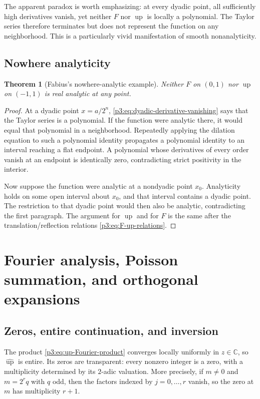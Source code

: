 \documentclass[11pt]{article}
\numberwithin{equation}{section}
\newtheorem{theorem}{Theorem}[section]
\theoremstyle{definition}
\theoremstyle{remark}
\newcommand{\C}{\mathbb C}
\newcommand{\upf}{\operatorname{up}}
\begin{document}
The apparent paradox is worth emphasizing: at every dyadic point, all sufficiently high derivatives vanish, yet neither $F$ nor $\upf$ is locally a polynomial.  The Taylor series therefore terminates but does not represent the function on any neighborhood.  This is a particularly vivid manifestation of smooth nonanalyticity.

\subsection{Nowhere analyticity}

\begin{theorem}[Fabius's nowhere-analytic example]\label{p3:thm:nowhere-analytic}
Neither $F$ on $(0,1)$ nor $\upf$ on $(-1,1)$ is real analytic at any point.
\end{theorem}

\begin{proof}
At a dyadic point $x=a/2^n$, \eqref{p3:eq:dyadic-derivative-vanishing} says that the Taylor series is a polynomial.  If the function were analytic there, it would equal that polynomial in a neighborhood.  Repeatedly applying the dilation equation to such a polynomial identity propagates a polynomial identity to an interval reaching a flat endpoint.  A polynomial whose derivatives of every order vanish at an endpoint is identically zero, contradicting strict positivity in the interior.

Now suppose the function were analytic at a nondyadic point $x_0$.  Analyticity holds on some open interval about $x_0$, and that interval contains a dyadic point.  The restriction to that dyadic point would then also be analytic, contradicting the first paragraph.  The argument for $\upf$ and for $F$ is the same after the translation/reflection relations \eqref{p3:eq:F-up-relations}.
\end{proof}

\section{Fourier analysis, Poisson summation, and orthogonal expansions}\label{p3:sec:fourier}

\subsection{Zeros, entire continuation, and inversion}

The product \eqref{p3:eq:up-Fourier-product} converges locally uniformly in $z\in\C$, so $\widehat{\upf}$ is entire.  Its zeros are transparent: every nonzero integer is a zero, with a multiplicity determined by its $2$-adic valuation.  More precisely, if $m\ne0$ and $m=2^r q$ with $q$ odd, then the factors indexed by $j=0,\ldots,r$ vanish, so the zero at $m$ has multiplicity $r+1$.
\end{document}
